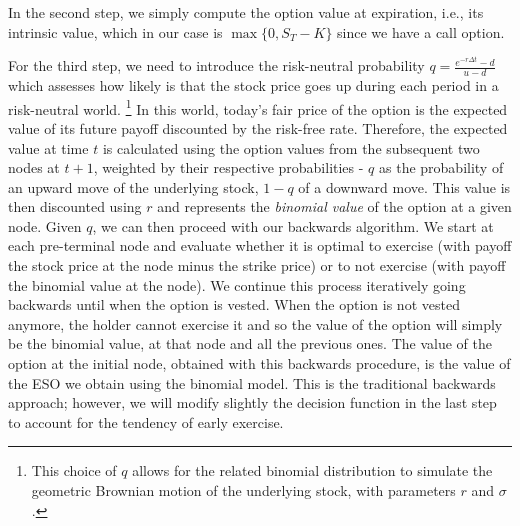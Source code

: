 In the second step, we simply compute the option value at expiration, i.e., its intrinsic value, which in our case is $\max \{0, S_T - K \}$ since we have a call option.

For the third step, we need to introduce the risk-neutral probability $q = \frac{e^{-r \Delta t} - d}{u-d}$ which assesses how likely is that the stock price goes up during each period in a risk-neutral world. \footnote{This choice of $q$ allows for the related binomial distribution to simulate the geometric Brownian motion of the underlying stock, with parameters $r$ and $\sigma$.} In this world, today's fair price of the option is the expected value of its future payoff discounted by the risk-free rate. Therefore, the expected value at time $t$ is calculated using the option values from the subsequent two nodes at $t+1$, weighted by their respective probabilities - $q$ as the probability of an upward move of the underlying stock, $1-q$ of a downward move. This value is then discounted using $r$ and represents the \textit{binomial value} of the option at a given node. 
Given $q$, we can then proceed with our backwards algorithm. We start at each pre-terminal node and evaluate whether it is optimal to exercise (with payoff the stock price at the node minus the strike price) or to not exercise (with payoff the binomial value at the node). We continue this process iteratively going backwards until when the option is vested. When the option is not vested anymore, the holder cannot exercise it and so the value of the option will simply be the binomial value, at that node and all the previous ones.
The value of the option at the initial node, obtained with this backwards procedure, is the value of the ESO we obtain using the binomial model.
This is the traditional backwards approach; however, we will modify slightly the decision function in the last step to account for the tendency of early exercise.

